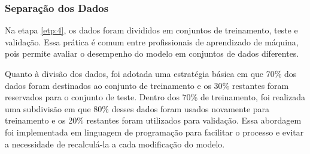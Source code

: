 \subsubsection{Separa\c c\~ao dos Dados}\label{subsubsec:divisao}

Na etapa \ref{etp:4}, os dados foram divididos em conjuntos de treinamento, teste e validação. Essa prática é comum entre profissionais de aprendizado de máquina, pois permite avaliar o desempenho do modelo em conjuntos de dados diferentes.

Quanto à divisão dos dados, foi adotada uma estratégia básica em que 70\% dos dados foram destinados ao conjunto de treinamento e os 30\% restantes foram reservados para o conjunto de teste. Dentro dos 70\% de treinamento, foi realizada uma subdivisão em que 80\% desses dados foram usados novamente para treinamento e os 20\% restantes foram utilizados para validação. Essa abordagem foi implementada em linguagem de programação para facilitar o processo e evitar a necessidade de recalculá-la a cada modificação do modelo.